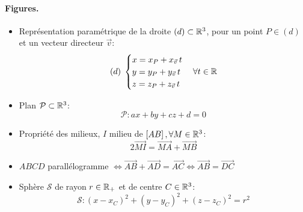 \documentclass[12pt]{article}
\begin{document}
\paragraph{Figures.}
\begin{itemize}
    \item Représentation paramétrique de la droite $(d) \subset \mathbb{R}^3$,
        pour un point $P \in (d)$ et un vecteur directeur $\vec{v}$: $$
            (d) \; \begin{cases}
                x = x_P + x_{\vec{v}}\,t \\ 
                y = y_P + y_{\vec{v}}\,t \\ 
                z = z_P + z_{\vec{v}}\,t \\ 
            \end{cases}  \forall t \in \mathbb{R}
        $$
    \item Plan $\mathcal{P} \subset \mathbb{R}^3$: $$
        \mathcal{P}: ax + by + cz + d = 0
    $$
    \item Propriété des milieux, 
        $I$ milieu de $\left[AB\right], \forall M \in \mathbb{R}^3$: 
        $$
            2\overrightarrow{MI} = \overrightarrow{MA} + \overrightarrow{MB} 
        $$
    \item $ABCD$ parallélogramme $
        \iff \overrightarrow{AB} + \overrightarrow{AD} = \overrightarrow{AC}
        \iff \overrightarrow{AB} = \overrightarrow{DC}
    $
    \item Sphère $\mathcal{S}$ de rayon $r \in \mathbb{R}_{+}$ et de centre $C \in \mathbb{R}^3$: $$
        \mathcal{S}: (x - x_C)^2 + (y - y_C)^2 + (z - z_C)^2 = r^2
    $$
    
\end{itemize}
\end{document}
